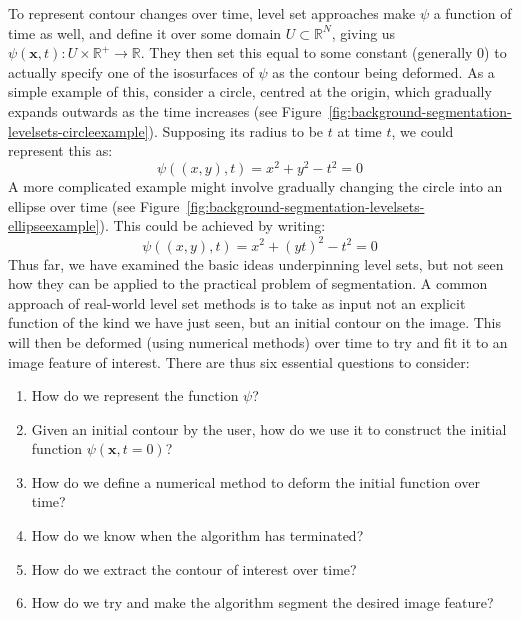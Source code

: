 

To represent contour changes over time, level set approaches make $\psi$ a function of time as well, and define it over some domain $U \subset \mathbb{R}^N$, giving us $\psi(\mathbf{x}, t) : U \times \mathbb{R}^+ \rightarrow \mathbb{R}$. They then set this equal to some constant (generally $0$) to actually specify one of the isosurfaces of $\psi$ as the contour being deformed. As a simple example of this, consider a circle, centred at the origin, which gradually expands outwards as the time increases (see Figure~\ref{fig:background-segmentation-levelsets-circleexample}). Supposing its radius to be $t$ at time $t$, we could represent this as:
%
\[
\psi((x,y),t) = x^2 + y^2 - t^2 = 0
\]
%
A more complicated example might involve gradually changing the circle into an ellipse over time (see Figure~\ref{fig:background-segmentation-levelsets-ellipseexample}). This could be achieved by writing:
%
\[
\psi((x,y),t) = x^2 + (yt)^2 - t^2 = 0
\]
%
Thus far, we have examined the basic ideas underpinning level sets, but not seen how they can be applied to the practical problem of segmentation. A common approach of real-world level set methods is to take as input not an explicit function of the kind we have just seen, but an initial contour on the image. This will then be deformed (using numerical methods) over time to try and fit it to an image feature of interest. There are thus six essential questions to consider:

\begin{enumerate}

\item How do we represent the function $\psi$?

\item Given an initial contour by the user, how do we use it to construct the initial function $\psi(\mathbf{x}, t = 0)$?

\item How do we define a numerical method to deform the initial function over time?

\item How do we know when the algorithm has terminated?

\item How do we extract the contour of interest over time?

\item How do we try and make the algorithm segment the desired image feature?

\end{enumerate}


